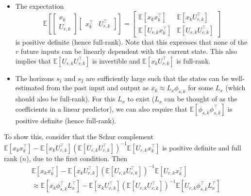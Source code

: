 \documentclass[11pt]{report} %
\begin{document}
\begin{itemize}
\item The expectation
\begin{equation}
\mathbb{E}\left[\begin{bmatrix}x_{k}\\
U_{r,k}
\end{bmatrix}\begin{bmatrix}x_{k}^{\top} & U_{r,k}^{\top}\end{bmatrix}\right] = \begin{bmatrix}\mathbb{E}\left[x_{k}x_{k}^{\top}\right] & \mathbb{E}\left[x_{k}U_{r,k}^{\top}\right] \\
\mathbb{E}\left[U_{r,k}x_{k}^{\top}\right] & \mathbb{E}\left[U_{r,k}U_{r,k}^{\top}\right]
\end{bmatrix}
\end{equation}
is positive definite (hence full-rank). Note that this expresses that none of the $r$ future inputs can be linearly dependent with the current state. This also implies that $\mathbb{E}\left[U_{r, k}U_{r, k}^{\top}\right]$ is invertible and $\mathbb{E}\left[x_{k}U_{r,k}^{\top}\right]$ is full-rank. 
\item The horizons $s_{1}$ and $s_{2}$ are sufficiently large such that the states can be well-estimated from the past input and output as $x_{k} \approx L_{x}\phi_{s, k}$ for some $L_{x}$ (which should also be full-rank). For this $L_{x}$ to exist ($L_{x}$ can be thought of as the coefficients in a linear predictor), we can also require that $\mathbb{E}\left[\phi_{s, k}\phi_{s, k}^{\top}\right]$ is positive definite (hence full-rank).
\end{itemize}
To show this, consider that the Schur complement $\mathbb{E}\left[x_{k}x_{k}^{\top}\right] - \mathbb{E}\left[x_{k}U_{r,k}^{\top}\right]\left(\mathbb{E}\left[U_{r,k}U_{r,k}^{\top}\right]\right)^{-1}\mathbb{E}\left[U_{r,k}x_{k}^{\top}\right]$ is positive definite and full rank ($n$), due to the first condition. Then
\begin{multline}
\mathbb{E}\left[x_{k}x_{k}^{\top}\right] - \mathbb{E}\left[x_{k}U_{r,k}^{\top}\right]\left(\mathbb{E}\left[U_{r,k}U_{r,k}^{\top}\right]\right)^{-1}\mathbb{E}\left[U_{r,k}x_{k}^{\top}\right] \\
\approx \mathbb{E}\left[x_{k}\phi_{s, k}^{\top}L_{x}^{\top}\right] - \mathbb{E}\left[x_{k}U_{r,k}^{\top}\right]\left(\mathbb{E}\left[U_{r,k}U_{r,k}^{\top}\right]\right)^{-1}\mathbb{E}\left[U_{r,k}\phi_{s, k}^{\top}L_{x}^{\top}\right]
\end{multline}
\end{document}
